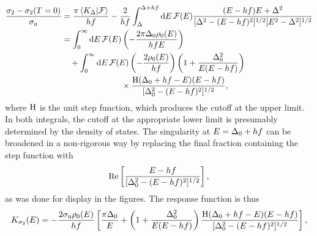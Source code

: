 \begin{align}
\begin{split}
\frac{\sigma_2 - \sigma_2(T = 0)}{\sigma_{\mathrm{n}}}
  &=
\frac{\pi \braket{K_{\Delta}}{\mathcal{F}}}{h f}
  - \frac{2}{h f} \int_{\Delta}^{\Delta + h f} \dd{E}
  \mathcal{F}(E)
  \frac{(E - h f) E + \Delta^2}
  {[\Delta^2 - (E - h f)^2]^{1/2} [E^2 - \Delta^2]^{1/2}} \\
  &=
  \int_{0}^{\infty}
  \dd{E} \mathcal{F}(E)
  \left( -\frac{2 \pi \Delta_0 \rho_0(E)}{h f E} \right) \\
  &\quad
  + \int_{0}^{\infty} \dd{E} \mathcal{F}(E)
  \left( -\frac{2 \rho_0(E)}{h f} \right)
  \left( 1 + \frac{\Delta_0^2}{E (E - h f)} \right) \\
  &\hspace{1in} \times
  \frac{\mathrm{H}(\Delta_0 + h f - E) (E - h f)}{[\Delta_0^2 - (E - h f)^2]^{1/2}},
\end{split}
\end{align}
where $\mathrm{H}$ is the unit step function, which produces the cutoff at the upper limit.
In both integrals, the cutoff at the appropriate lower limit is 
presumably determined by the density of states.
The singularity at $E = \Delta_0 + h f$ can be broadened in a non-rigorous way by replacing the final fraction containing the step function with
\begin{equation}
\mathrm{Re}  \left[
  \frac{E - h f}{[\Delta_0^2 - (E - h f)^2]^{1/2}} \right],
\end{equation}
as was done for display in the figures.
The response function is thus
\begin{equation}
K_{\sigma_2}(E)
  =
  - \frac{2 \sigma_{\mathrm{n}} \rho_0(E)}{h f}
  \left[
  \frac{\pi \Delta_0}{E}
  +   \left( 1 + \frac{\Delta_0^2}{E (E - h f)} \right)
  \frac{\mathrm{H}(\Delta_0 + h f - E) (E - h f)}{[\Delta_0^2 - (E - h f)^2]^{1/2}}
  \right],
\label{eqn:first-order_response.responseqpoccupancy_imconductivity}
\end{equation}
